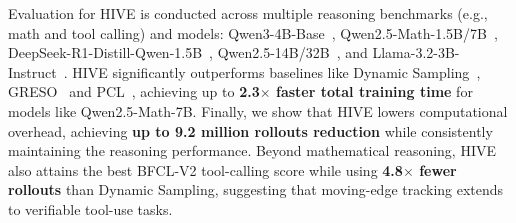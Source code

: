 Evaluation for HIVE is conducted across multiple reasoning benchmarks (e.g., math and tool calling) and models: Qwen3-4B-Base~\cite{yang2025qwen3technicalreport}, 
Qwen2.5-Math-1.5B/7B~\cite{yang2024qwen25mathtechnicalreportmathematical}, DeepSeek-R1-Distill-Qwen-1.5B~\cite{guo2025deepseek}, 
Qwen2.5-14B/32B~\cite{qwen2.5-large}, and Llama-3.2-3B-Instruct~\cite{grattafiori2024llama3}. HIVE significantly outperforms 
baselines like Dynamic Sampling~\cite{yu2025dapo}, GRESO~\cite{zheng2025act} and PCL~\cite{Gao2025PCL}, achieving up to \textbf{2.3$\times$ faster total training time} for models like Qwen2.5-Math-7B. Finally, we show that HIVE lowers computational 
overhead, achieving \textbf{up to 9.2 million rollouts reduction} while consistently maintaining the reasoning performance. Beyond mathematical reasoning, HIVE also attains the best BFCL-V2 tool-calling score while using \textbf{4.8$\times$ fewer rollouts} than Dynamic Sampling, suggesting that moving-edge tracking extends to verifiable tool-use tasks.
